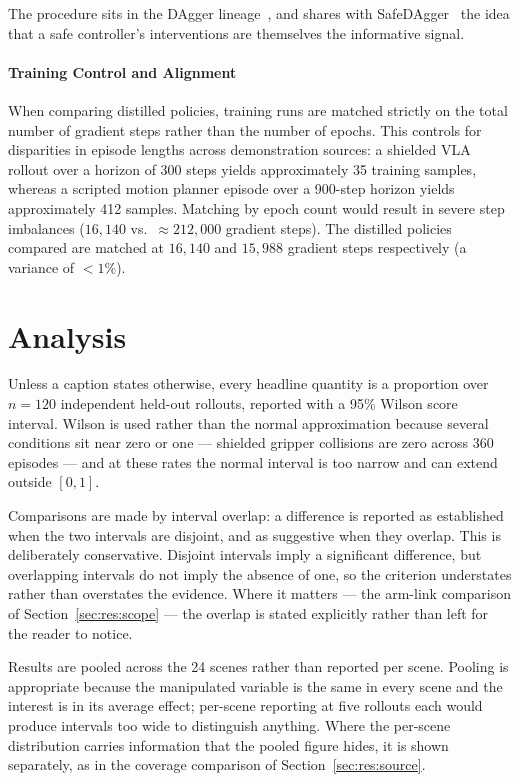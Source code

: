 \documentclass[a4paper,11pt]{report}
\begin{document}
The procedure sits in the DAgger lineage~\cite{ross2011dagger}, and shares with
SafeDAgger~\cite{zhang2017safedagger} the idea that a safe controller's interventions are
themselves the informative signal. 

\paragraph{Training Control and Alignment}
When comparing distilled policies, training runs are matched strictly on the total number of gradient steps rather than the number of epochs. This controls for disparities in episode lengths across demonstration sources: a shielded VLA rollout over a horizon of 300 steps yields approximately 35 training samples, whereas a scripted motion planner episode over a 900-step horizon yields approximately 412 samples. Matching by epoch count would result in severe step imbalances ($16{,}140$ vs.\ $\approx 212{,}000$ gradient steps). The distilled policies compared are matched at $16{,}140$ and $15{,}988$ gradient steps respectively (a variance of $<1\%$).

\section{Analysis}\label{sec:method:analysis}

Unless a caption states otherwise, every headline quantity is a proportion over $n = 120$
independent held-out rollouts, reported with a 95\% Wilson score interval. Wilson is used rather than the normal approximation because several
conditions sit near zero or one --- shielded gripper collisions are zero across 360 episodes --- and
at these rates the normal interval is too narrow and can extend outside $[0,1]$.

Comparisons are made by interval overlap: a difference is reported as established when the two
intervals are disjoint, and as suggestive when they overlap. This is deliberately conservative.
Disjoint intervals imply a significant difference, but overlapping intervals do not imply the
absence of one, so the criterion understates rather than overstates the evidence. Where it matters
--- the arm-link comparison of Section~\ref{sec:res:scope} --- the overlap is stated explicitly
rather than left for the reader to notice.

Results are pooled across the 24 scenes rather than reported per scene. Pooling is appropriate
because the manipulated variable is the same in every scene and the interest is in its average
effect; per-scene reporting at five rollouts each would produce intervals too wide to distinguish
anything. Where the per-scene distribution carries information that the pooled figure hides, it is
shown separately, as in the coverage comparison of Section~\ref{sec:res:source}.
\end{document}
